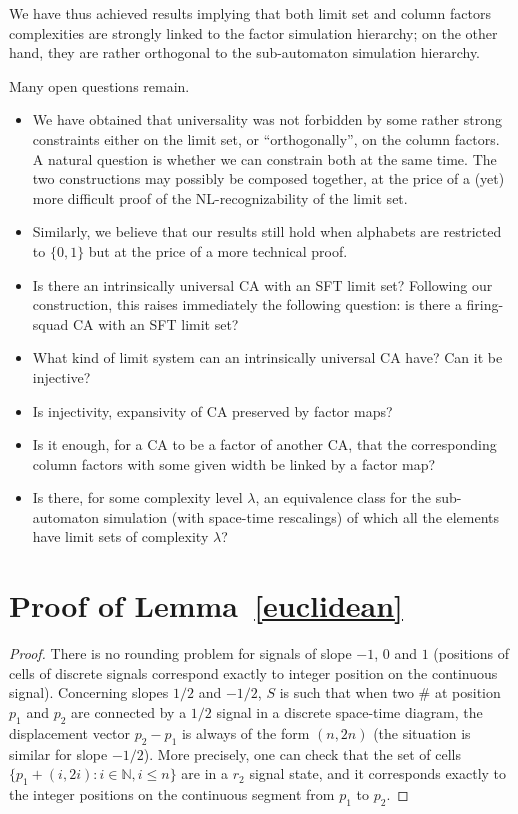 \documentclass{jac}
\theoremstyle{definition}
\begin{document}
We have thus achieved results implying that both limit set and column factors complexities are strongly linked to the factor simulation hierarchy; on the other hand, they are rather orthogonal to the sub-automaton simulation hierarchy.

Many open questions remain.
\begin{itemize}
\item We have obtained that universality was not forbidden by some
  rather strong constraints either on the limit set, or
  ``orthogonally'', on the column factors.  A natural question is
  whether we can constrain both at the same time. The two constructions
  may possibly be composed together, at the price of a (yet) more
  difficult proof of the NL-recognizability of the limit set.
\item Similarly, we believe that our results still hold when alphabets are restricted to $\{0,1\}$ but at the price of a more technical proof.
\item Is there an intrinsically universal CA with an SFT limit set? Following our
  construction, this raises immediately the following question: is there a
  firing-squad CA with an SFT limit set?
\item What kind of limit system can an intrinsically universal CA have? Can it be injective?
\item Is injectivity, expansivity of CA preserved by factor maps?
\item Is it enough, for a CA to be a factor of another CA, that the corresponding column factors with some given width be linked by a factor map?
\item Is there, for some complexity level $\lambda$, an equivalence
  class for the sub-automaton simulation (with space-time rescalings)
  of which all the elements have limit sets of complexity $\lambda$?
\end{itemize}




\newpage
\appendix

\section{Proof of Lemma~\ref{euclidean}}
\begin{proof}
  There is no rounding problem for signals of slope $-1$, $0$ and $1$ (positions
  of cells of discrete signals correspond exactly to integer position on the
  continuous signal). Concerning slopes $1/2$ and $-1/2$, $S$ is such that when
  two $\#$ at position $p_1$ and $p_2$ are connected by a $1/2$ signal in a
  discrete space-time diagram, the displacement vector $p_2-p_1$ is always of
  the form $(n,2n)$ (the situation is similar for slope $-1/2$). More precisely,
  one can check that the set of cells ${\{p_1+(i,2i) : i\in\mathbb{N}, i\leq
    n\}}$ are in a $r_2$ signal state, and it corresponds exactly to the integer
  positions on the continuous segment from $p_1$ to $p_2$.
\end{proof}
\end{document}
